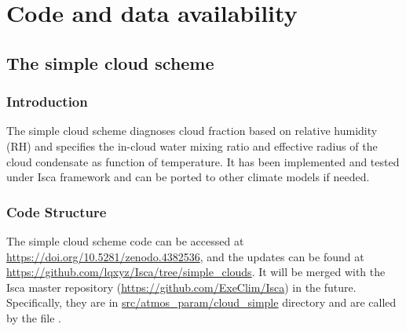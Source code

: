 \chapter{Code and data availability}

\section{The simple cloud scheme}

\subsection{Introduction}
The simple cloud scheme diagnoses cloud fraction based on relative humidity (RH) and specifies the in-cloud water mixing ratio and effective radius of the cloud condensate as function of temperature. It has been implemented and tested under Isca framework \citep{Vallis2018} and can be ported to other climate models if needed.

\subsection{Code Structure}

The simple cloud scheme code can be accessed at \url{https://doi.org/10.5281/zenodo.4382536}, and the updates can be found at \url{https://github.com/lqxyz/Isca/tree/simple_clouds}. It will be merged with the Isca master repository (\url{https://github.com/ExeClim/Isca}) in the future. Specifically, they are in \url{src/atmos\_param/cloud\_simple} directory and are called by the file .

